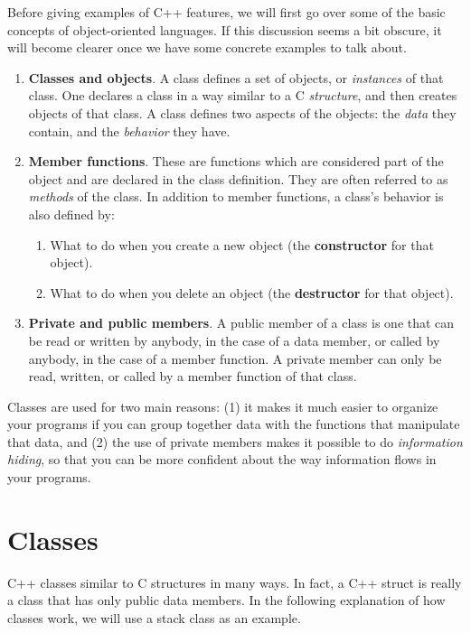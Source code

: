 Before giving examples of C++ features, we will first go over some of
the basic concepts of object-oriented languages.  If this discussion
seems a bit obscure, it will become clearer once we have some concrete
examples to talk about.
\begin{enumerate}
\item {\bf Classes and objects}.  A class defines a set of objects, or
{\em instances} of that class.
One declares a class in a way similar to a C {\em structure}, and then
creates objects of that class.  A class defines two aspects of the
objects: the {\em data} they contain, and the {\em behavior} they
have.
\item {\bf Member functions}.  These are functions which are
considered part of the object and are declared in the class
definition.  They are often referred to as {\em methods} of the class.
In addition to member functions, a class's behavior is also defined
by:
\begin{enumerate}
\item What to do when you create a new object (the {\bf constructor}
for that object).
\item What to do when you delete an object (the {\bf destructor} for
that object).
\end{enumerate}
\item {\bf Private and public members}.  A public member of a class is
one that can be read or written by anybody, in the case of a data
member, or called by anybody, in the case of a member function.  A
private member can only be read, written, or called by a member
function of that class.
\end{enumerate}

Classes are used for two main reasons: (1) it makes it much easier to
organize your programs if you can group together data with the
functions that manipulate that data, and (2) the use of private
members makes it possible to do {\em information hiding}, so that you
can be more confident about the way information flows in your
programs.

\section{Classes}

C++ classes similar to C structures in many ways.  In fact, a C++
struct is really a class that has only public data members.
In the following explanation of how classes work, we will use a stack
class as an example.

